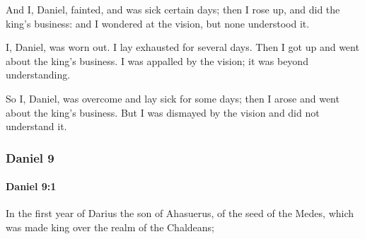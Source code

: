			\begin{versebox}
					\item[BHS] 
					\item[LXX] 
					\item[ASV] And I, Daniel, fainted, and was sick certain days; then I rose up, and did the king's business: and I wondered at the vision, but none understood it.
					\item[NIV] I, Daniel, was worn out. I lay exhausted for several days. Then I got up and went about the king’s business. I was appalled by the vision; it was beyond understanding.
					\item[NRSV] So I, Daniel, was overcome and lay sick for some days; then I arose and went about the king’s business. But I was dismayed by the vision and did not understand it.
			\end{versebox}
	\subsubsection{Daniel 9} %
		\label{DANIEL-9}

		\paragraph{Daniel 9:1} %
			\label{DANIEL-9-1}

			In the first year of Darius the son of Ahasuerus, of the seed of the Medes, which was made king over the realm of the Chaldeans;

